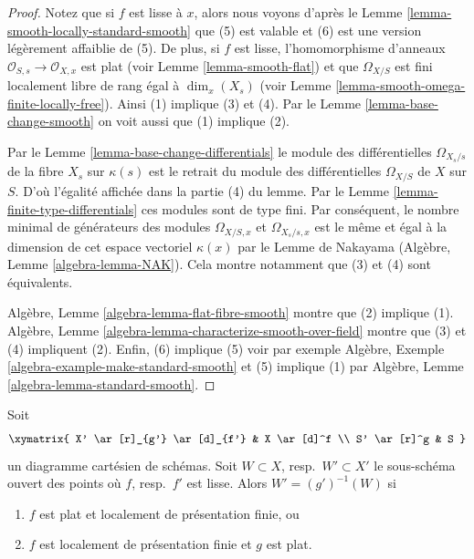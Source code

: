 \begin{proof}
Notez que si $f$ est lisse à $x$, alors
nous voyons d'après le Lemme \ref{lemma-smooth-locally-standard-smooth} que (5) est valable et (6)
est une version légèrement affaiblie de (5). De plus, si $f$
est lisse, l'homomorphisme d'anneaux
$\mathcal{O}_{S, s} \to \mathcal{O}_{X, x}$ est plat (voir Lemme \ref{lemma-smooth-flat}) et que
$\Omega_{X/S}$ est fini localement
libre de rang égal à $\dim_x(X_s)$ (voir Lemme \ref{lemma-smooth-omega-finite-locally-free}). Ainsi
(1) implique (3) et (4). Par le Lemme \ref{lemma-base-change-smooth} on voit
aussi que (1) implique (2).

\medskip\noindent
Par le Lemme \ref{lemma-base-change-differentials} le module des différentielles
$\Omega_{X_s/s}$ de la fibre $X_s$ sur $\kappa(s)$
est le retrait du module des différentielles $\Omega_{X/S}$
de $X$ sur $S$. D’où l’égalité affichée
dans la partie (4) du lemme. Par le Lemme \ref{lemma-finite-type-differentials} ces modules
sont de type fini. Par conséquent, le nombre minimal de
générateurs des modules
$\Omega_{X/S, x}$ et $\Omega_{X_s/s, x}$ est le même et égal à la dimension
de cet espace vectoriel $\kappa(x)$ par le Lemme de Nakayama
(Algèbre, Lemme \ref{algebra-lemma-NAK}). Cela montre notamment que (3) et
(4) sont équivalents.

\medskip\noindent
Algèbre, Lemme \ref{algebra-lemma-flat-fibre-smooth} montre que (2)
implique
(1). Algèbre, Lemme \ref{algebra-lemma-characterize-smooth-over-field} montre que (3)
et (4) impliquent (2). Enfin, (6) implique
(5) voir par exemple Algèbre, Exemple \ref{algebra-example-make-standard-smooth}
et (5) implique (1) par Algèbre, Lemme \ref{algebra-lemma-standard-smooth}.
\end{proof}

\begin{lemma}
\label{lemma-set-points-where-fibres-smooth}
Soit
$$
\xymatrix{
X' \ar[r]_{g'} \ar[d]_{f'} & X \ar[d]^f \\
S' \ar[r]^g & S
}
$$
un diagramme cartésien de schémas. Soit $W \subset X$, resp.\ $W' \subset X'$ le sous-schéma
ouvert des points où $f$, resp.\ $f'$ est
lisse. Alors $W' = (g')^{-1}(W)$ si
\begin{enumerate}
\item $f$ est plat et localement de présentation finie, ou
\item $f$ est localement de présentation finie et $g$ est plat.
\end{enumerate}
\end{lemma}

